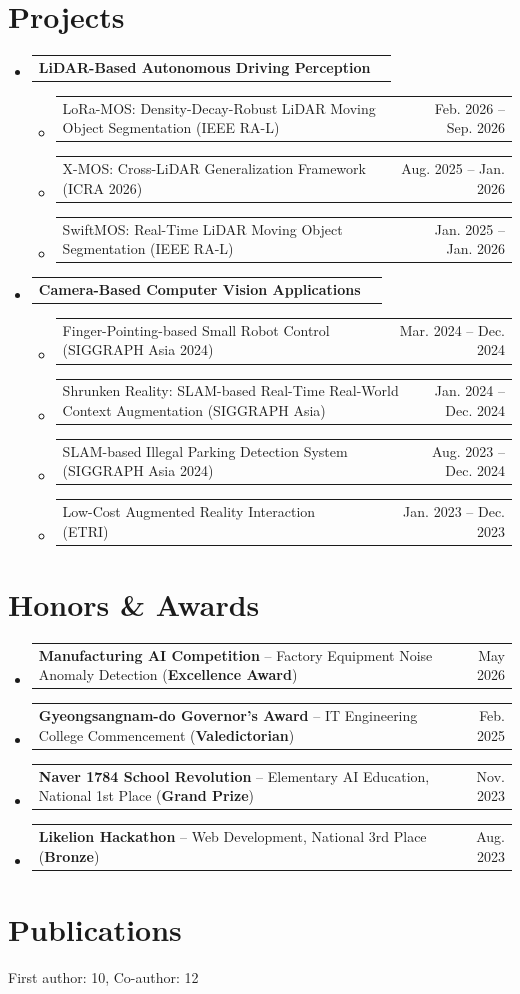 \documentclass[letterpaper,11pt]{article}
\makeatletter
\newcommand{\resumeSkills}[1]{
  \item\small{
    \begin{tabular*}{0.97\textwidth}[t]{l@{\extracolsep{\fill}}r}
      #1
    \end{tabular*}\vspace{-2pt}
  }
}
\newcommand{\resumeProjectItem}[1]{
  \item\footnotesize{
    \begin{tabular*}{0.93\textwidth}[t]{l@{\extracolsep{\fill}}r}
      #1
    \end{tabular*}\vspace{-2pt}
  }
}
\newcommand{\resumeSubHeadingListStart}{\begin{itemize}[leftmargin=*]}
\newcommand{\resumeSubHeadingListEnd}{\end{itemize}}
\newcommand{\resumeItemListStart}{\begin{itemize}[topsep=-2pt,partopsep=0pt]}
\newcommand{\resumeItemListEnd}{\end{itemize}\vspace{1.6pt}}
\makeatother
\begin{document}
\section{Projects}
\resumeSubHeadingListStart
\resumeSkills{\textbf{LiDAR-Based Autonomous Driving Perception}}
\resumeItemListStart
\resumeProjectItem{LoRa-MOS: Density-Decay-Robust LiDAR Moving Object Segmentation (IEEE RA-L) & Feb. 2026 -- Sep. 2026}
\resumeProjectItem{X-MOS: Cross-LiDAR Generalization Framework (ICRA 2026) & Aug. 2025 -- Jan. 2026}
\resumeProjectItem{SwiftMOS: Real-Time LiDAR Moving Object Segmentation (IEEE RA-L) & Jan. 2025 -- Jan. 2026}
\resumeItemListEnd
\resumeSkills{\textbf{Camera-Based Computer Vision Applications}}
\resumeItemListStart
\resumeProjectItem{Finger-Pointing-based Small Robot Control (SIGGRAPH Asia 2024) & Mar. 2024 -- Dec. 2024}
\resumeProjectItem{Shrunken Reality: SLAM-based Real-Time Real-World Context Augmentation (SIGGRAPH Asia) & Jan. 2024 -- Dec. 2024}
\resumeProjectItem{SLAM-based Illegal Parking Detection System (SIGGRAPH Asia 2024) & Aug. 2023 -- Dec. 2024}
\resumeProjectItem{Low-Cost Augmented Reality Interaction (ETRI) & Jan. 2023 -- Dec. 2023}
\resumeItemListEnd
\resumeSubHeadingListEnd

\section{Honors \& Awards}
\resumeSubHeadingListStart
\resumeSkills{\textbf{Manufacturing AI Competition} -- Factory Equipment Noise Anomaly Detection (\textbf{Excellence Award}) & May 2026}
\resumeSkills{\textbf{Gyeongsangnam-do Governor's Award} -- IT Engineering College Commencement (\textbf{Valedictorian}) & Feb. 2025}
\resumeSkills{\textbf{Naver 1784 School Revolution} -- Elementary AI Education, National 1st Place (\textbf{Grand Prize}) & Nov. 2023}
\resumeSkills{\textbf{Likelion Hackathon} -- Web Development, National 3rd Place (\textbf{Bronze}) & Aug. 2023}
\resumeSubHeadingListEnd

\makeatletter{}\makeatother
\section{Publications}
\small First author: 10, Co-author: 12
\end{document}
